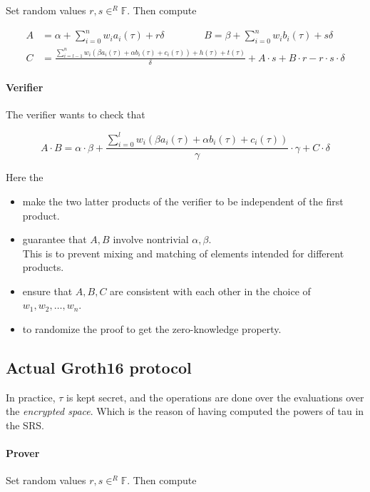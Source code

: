 \documentclass{article}
\begin{document}
Set random values $r, s \in^R \mathbb{F}$. Then compute

\begin{align*}
    A &= \alpha + \sum_{i=0}^n w_i a_i(\tau) + r \delta
    ~~~~~~~~~~~~~~~~~~ B = \beta + \sum_{i=0}^n w_i b_i(\tau) + s \delta\\
    C &= \frac{\sum_{i=l-1}^n w_i (\beta a_i(\tau) + \alpha b_i(\tau) + c_i(\tau)) + h(\tau) + t(\tau)}{\delta} + A \cdot s + B \cdot r - r \cdot s \cdot \delta
\end{align*}


\paragraph{Verifier}
The verifier wants to check that

$$A \cdot B = \alpha \cdot \beta + \frac{\sum_{i=0}^l w_i (\beta a_i(\tau) + \alpha b_i(\tau) + c_i(\tau))}{\gamma} \cdot \gamma + C \cdot \delta$$

Here the
\begin{itemize}
    \item[$\gamma,\delta$:] make the two latter products of the verifier to be independent of the first product.
    \item[$\alpha \cdot \beta$:] guarantee that $A, B$ involve nontrivial $\alpha, \beta$.\\
	This is to prevent mixing and matching of elements intended for different products.
    \item[$\alpha, \beta$:] ensure that $A, B, C$ are consistent with each other in the choice of\\
	$w_1, w_2, \ldots, w_n$.
    \item[$r, s$:] to randomize the proof to get the zero-knowledge property.
\end{itemize}

\vspace{1cm}

\subsection{Actual Groth16 protocol}
In practice, $\tau$ is kept secret, and the operations are done over the evaluations over the \emph{encrypted space}. Which is the reason of having computed the powers of tau in the SRS.

\paragraph{Prover}
Set random values $r, s \in^R \mathbb{F}$. Then compute
\end{document}
